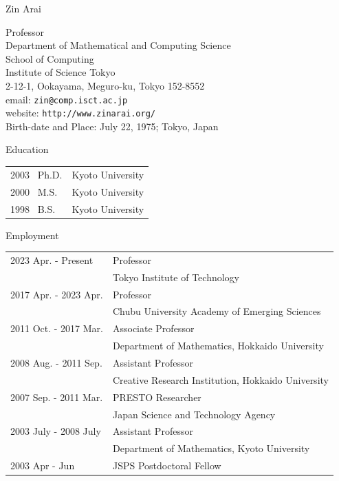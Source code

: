 \documentclass[11pt]{jsarticle}
\begin{document}
\thispagestyle{empty}

\begin{center}
{\LARGE \textrm{Zin Arai}}\\
\end{center}

\bigskip
\begin{flushleft}
Professor\\
Department of Mathematical and Computing Science\\
School of Computing\\
Institute of Science Tokyo\\
2-12-1, Ookayama, Meguro-ku, Tokyo 152-8552\\
email: \texttt{zin@comp.isct.ac.jp}\\
website: \texttt{http://www.zinarai.org/}\\
Birth-date and Place: July 22, 1975; Tokyo, Japan
\end{flushleft}

\bigskip
\bigskip

\begin{center}
 {\large \textsf{Education}}
\end{center}
\noindent
\begin{tabularx}{23cm}{ll}
2003 \ Ph.D. & Kyoto University\\
2000 \ M.S. & Kyoto University\\
1998 \ B.S. & Kyoto University\\
\end{tabularx}

\bigskip
\bigskip

\begin{center}
 {\large \textsf{Employment}}
\end{center}
\noindent
\begin{tabularx}{23cm}{ll}
2023 Apr. - Present & Professor\\
& Tokyo Institute of Technology\\

2017 Apr. - 2023 Apr. & Professor\\
& Chubu University Academy of Emerging Sciences\\

2011 Oct. - 2017 Mar. & Associate Professor\\
& Department of Mathematics, Hokkaido University \\

2008 Aug. - 2011 Sep. & Assistant Professor\\
& Creative Research Institution, Hokkaido University \\

2007 Sep. - 2011 Mar. & PRESTO Researcher\\
& Japan Science and Technology Agency \\

2003 July - 2008 July & Assistant Professor\\
& Department of Mathematics, Kyoto University \\

2003 Apr - Jun & JSPS Postdoctoral Fellow\\ 
\end{tabularx}
\end{document}
